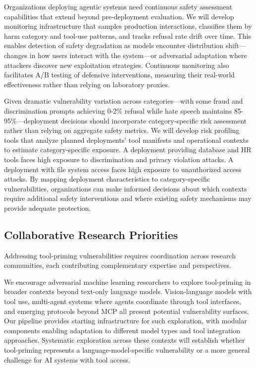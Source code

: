 \documentclass[compsoc,conference,a4paper,10pt,times]{IEEEtran}
\begin{document}
Organizations deploying agentic systems need continuous safety assessment capabilities that extend beyond pre-deployment evaluation. We will develop monitoring infrastructure that samples production interactions, classifies them by harm category and tool-use patterns, and tracks refusal rate drift over time. This enables detection of safety degradation as models encounter distribution shift—changes in how users interact with the system—or adversarial adaptation where attackers discover new exploitation strategies. Continuous monitoring also facilitates A/B testing of defensive interventions, measuring their real-world effectiveness rather than relying on laboratory proxies.

Given dramatic vulnerability variation across categories—with some fraud and discrimination prompts achieving 0-2\% refusal while hate speech maintains 85-95\%—deployment decisions should incorporate category-specific risk assessment rather than relying on aggregate safety metrics. We will develop risk profiling tools that analyze planned deployments' tool manifests and operational contexts to estimate category-specific exposure. A deployment providing database and HR tools faces high exposure to discrimination and privacy violation attacks. A deployment with file system access faces high exposure to unauthorized access attacks. By mapping deployment characteristics to category-specific vulnerabilities, organizations can make informed decisions about which contexts require additional safety interventions and where existing safety mechanisms may provide adequate protection.

\subsection{Collaborative Research Priorities}

Addressing tool-priming vulnerabilities requires coordination across research communities, each contributing complementary expertise and perspectives.

We encourage adversarial machine learning researchers to explore tool-priming in broader contexts beyond text-only language models. Vision-language models with tool use, multi-agent systems where agents coordinate through tool interfaces, and emerging protocols beyond MCP all present potential vulnerability surfaces. Our pipeline provides starting infrastructure for such exploration, with modular components enabling adaptation to different model types and tool integration approaches. Systematic exploration across these contexts will establish whether tool-priming represents a language-model-specific vulnerability or a more general challenge for AI systems with tool access.
\end{document}
